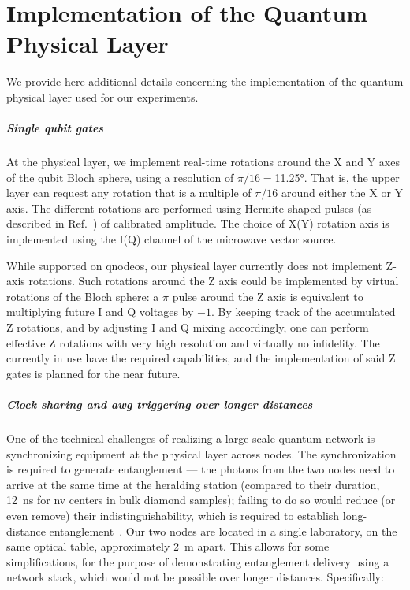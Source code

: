 \chapter{Implementation of the Quantum Physical Layer}
\label{app:phys}

We provide here additional details concerning the implementation of the quantum physical layer used
for our experiments.

\paragraph{Single qubit gates}

At the physical layer, we implement real-time rotations around the X and Y axes of the qubit Bloch
sphere, using a resolution of $\pi/16=$\ang{11.25}. That is, the upper layer can request any
rotation that is a multiple of $\pi/16$ around either the X or Y axis. The different rotations are
performed using Hermite-shaped pulses (as described in Ref.~\cite{pompili_2021_multinode}) of
calibrated amplitude. The choice of X(Y) rotation axis is implemented using the I(Q) channel of the
microwave vector source.

While supported on \acrshort{qnodeos}, our physical layer currently does not implement Z-axis
rotations. Such rotations around the Z axis could be implemented by virtual rotations of the Bloch
sphere: a $\pi$ pulse around the Z axis is equivalent to multiplying future I and Q voltages by
$-1$. By keeping track of the accumulated Z rotations, and by adjusting I and Q mixing accordingly,
one can perform effective Z rotations with very high resolution and virtually no infidelity. The
 currently in use have the required capabilities, and the implementation of said Z
gates is planned for the near future.

\paragraph{Clock sharing and \acrshort{awg} triggering over longer distances}

One of the technical challenges of realizing a large scale quantum network is synchronizing
equipment at the physical layer across nodes. The synchronization is required to generate
entanglement --- the photons from the two nodes need to arrive at the same time at the heralding
station (compared to their duration, \qty{12}{\ns} for \acrshort{nv} centers in bulk diamond
samples); failing to do so would reduce (or even remove) their indistinguishability, which is
required to establish long-distance entanglement~\cite{pompili_2021_multinode}. Our two nodes are
located in a single laboratory, on the same optical table, approximately \qty{2}{\m} apart. This
allows for some simplifications, for the purpose of demonstrating entanglement delivery using a
network stack, which would not be possible over longer distances. Specifically:

